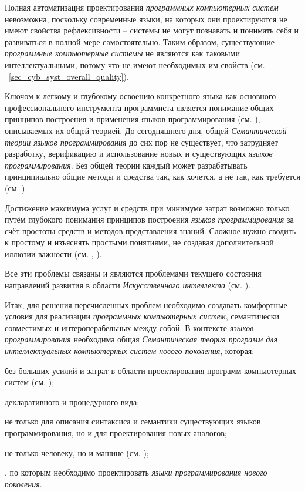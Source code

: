 \begin{textitemize}
    \item Полная автоматизация проектирования \textit{программных компьютерных систем} невозможна, поскольку современные языки, на которых они проектируются не имеют свойства рефлексивности -- системы не могут познавать и понимать себя и развиваться в полной мере самостоятельно. Таким образом, существующие \textit{программные компьютерные системы} не являются как таковыми интеллектуальными, потому что не имеют необходимых им свойств (см. ~\ref{sec_cyb_syst_overall_quality}).
    \item Ключом к легкому и глубокому освоению конкретного языка как основного профессионального инструмента программиста является понимание общих принципов построения и применения языков программирования (см. ), описываемых их общей теорией. До сегодняшнего дня, общей \textit{Семантической теории языков программирования} до сих пор не существует, что затрудняет разработку, верификацию и использование новых и существующих \textit{языков программирования}. Без общей теории каждый может разрабатывать принципиально общие методы и средства так, как хочется, а не так, как требуется (см. ).
    \item Достижение максимума услуг и средств при минимуме затрат возможно только путём глубокого понимания принципов построения \textit{языков программирования} за счёт простоты средств и методов представления знаний. Сложное нужно сводить к простому и изъяснять простыми понятиями, не создавая дополнительной иллюзии важности (см. , ).
\end{textitemize}

Все эти проблемы связаны и являются проблемами текущего состояния направлений развития в области \textit{Искусственного интеллекта} (см. ).

Итак, для решения перечисленных проблем необходимо создавать комфортные условия для реализации \textit{программных компьютерных систем}, семантически совместимых и интероперабельных между собой. В контексте \textit{языков программирования} необходима общая \textit{Семантическая теория программ для интеллектуальных компьютерных систем нового поколения}, которая:
\begin{textitemize}
    \item {} без больших усилий и затрат  в области проектирования программ компьютерных систем (см. );
    \item {} декларативного и процедурного вида;
    \item {} не только для описания синтаксиса и семантики существующих языков программирования, но и для проектирования новых аналогов;
    \item {} не только человеку, но и машине (см. );
    \item {}, по которым необходимо проектировать \textit{языки программирования нового поколения}.
\end{textitemize}

